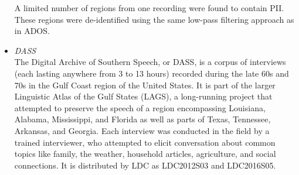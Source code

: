 \documentclass{article}
\begin{document}
\begin{appendices}
\begin{itemize}
            A limited number of regions from one recording were found to contain PII. These regions were de-identified using the same low-pass filtering approach as in ADOS.
        \item {\it DASS} \\
            The Digital Archive of Southern Speech, or DASS, is a corpus of interviews (each lasting anywhere from 3 to 13 hours) recorded during the late 60s and 70s in the Gulf Coast region of the United States. It is part of the larger Linguistic Atlas of the Gulf States (LAGS), a long-running project that attempted to preserve the speech of a region encompassing Louisiana, Alabama, Mississippi, and Florida as well as parts of Texas, Tennessee, Arkansas, and Georgia. Each interview was conducted in the field by a trained interviewer, who attempted to elicit conversation about common topics like family, the weather, household articles, agriculture, and social connections. It is distributed by LDC as LDC2012S03 and LDC2016S05.
            

\end{itemize}
\end{appendices}
\end{document}
